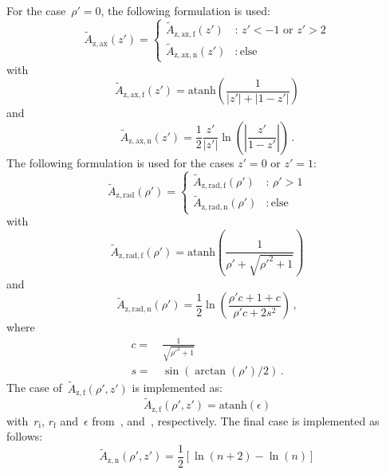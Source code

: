 For the case~$\rho'=0$, the following formulation is used:
\begin{equation}
  \tilde{A}_\mathrm{z,ax} (z') =
  \begin{cases}
    \tilde{A}_\mathrm{z,ax,f} (z') &:\, z' < -1 \textrm{ or } z' > 2 \\
    \tilde{A}_\mathrm{z,ax,n} (z') &:\, \textrm{else}
  \end{cases}
\end{equation}
with
\begin{equation}
  \tilde{A}_\mathrm{z,ax,f} (z') = \textrm{atanh}\left( \frac{1}{|z'| + |1 - z'|} \right)
\end{equation}
and
\begin{equation}
  \tilde{A}_\mathrm{z,ax,n} (z') = \frac{1}{2} \frac{z'}{|z'|} \ln \left(\left| \frac{z'}{1 - z'} \right| \right) \, .
\end{equation}
The following formulation is used for the cases $z'=0$ or $z'=1$:
\begin{equation}
  \tilde{A}_\mathrm{z,rad} (\rho') =
  \begin{cases}
    \tilde{A}_\mathrm{z,rad,f} (\rho')  &:\, \rho' > 1 \\
    \tilde{A}_\mathrm{z,rad,n} (\rho') &:\, \textrm{else}
  \end{cases}
\end{equation}
with
\begin{equation}
  \tilde{A}_\mathrm{z,rad,f} (\rho') = \textrm{atanh}\left( \frac{1}{\rho' + \sqrt{{\rho'}^2 + 1}} \right)
\end{equation}
and
\begin{equation}
  \tilde{A}_\mathrm{z,rad,n} (\rho') = \frac{1}{2} \ln \left(\frac{\rho' c + 1 + c}{\rho' c + 2 s^2 }\right) \, ,
\end{equation}
where
\begin{align}
  c =&\, \frac{1}{\sqrt{{\rho'}^2 + 1}} \\
  s =&\, \sin(\arctan(\rho')/2) \, .
\end{align}
The case of~$\tilde{A}_\mathrm{z,f}(\rho', z')$ is implemented as:
\begin{equation}
  \tilde{A}_\mathrm{z,f}(\rho', z') = \textrm{atanh} (\epsilon)
\end{equation}
with~$r_\mathrm{i}$, $r_\mathrm{f}$ and~$\epsilon$ from~,  and~, respectively.
The final case is implemented as follows:
\begin{equation}
  \tilde{A}_\mathrm{z,n} (\rho', z') = \frac{1}{2} \left[ \ln\left(n + 2 \right) - \ln \left( n \right)  \right]
\end{equation}
